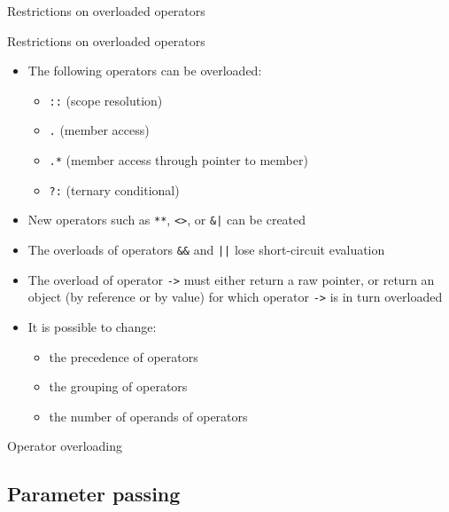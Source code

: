 \begin{frame}{Restrictions on overloaded operators}{}
  \begin{block}{Restrictions on overloaded operators}
    \begin{itemize}
    \item
      The following operators can  be overloaded:
      \begin{itemize}
      \item
        \lstinline!::! (scope resolution)
      \item
        \lstinline!.! (member access)
      \item
        \lstinline!.*! (member access through pointer to member)
      \item
        \lstinline!?:! (ternary conditional)
      \end{itemize}
    \item
      New operators such as \lstinline!**!, \lstinline!<>!, or \lstinline!&|! can  be created
    \item
      The overloads of operators \lstinline!&&! and \lstinline!||! lose short-circuit evaluation
    \item
      The overload of operator \lstinline!->! must either return a raw pointer, or return an object (by reference or by value) for which operator \lstinline!->! is in turn overloaded
    \item
      It is  possible to change:
      \begin{itemize}
      \item
        the precedence of operators
      \item
        the grouping of operators
      \item
        the number of operands of operators
      \end{itemize}
    \end{itemize}
  \end{block}
\end{frame}

\begin{frame}{Operator overloading}{}
  \begin{example}
  \end{example}
\end{frame}

\subsection{Parameter passing}

